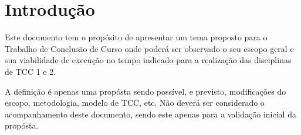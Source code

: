 \section{Introdução}

Este documento tem o propósito de apresentar um tema proposto para o Trabalho de Conclusão de Curso
onde poderá ser observado o seu escopo geral e sua viabilidade de execução no tempo indicado para
a realização das disciplinas de TCC 1 e 2.

A definição é apenas uma propósta sendo possível, e previsto, modificações do escopo, metodologia,
modelo de TCC, etc. Não deverá ser considerado o acompanhamento deste documento, sendo este apenas
para a validação inicial da propósta.
